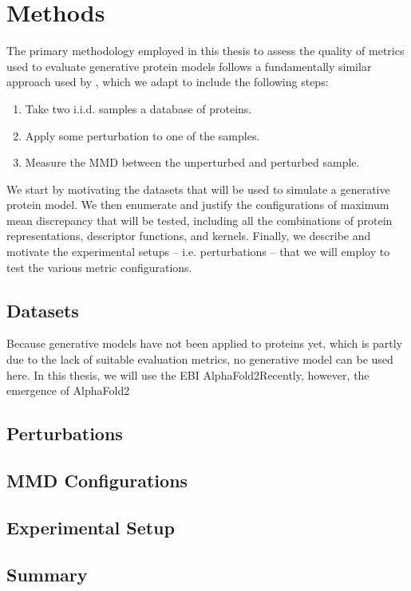 \chapter{Methods}


The primary methodology employed in this thesis to assess the quality of metrics
used to evaluate generative protein models follows a fundamentally similar
approach used by \cite{o2021evaluation}, which we adapt to include the following
steps:

\begin{enumerate}
\item Take two i.i.d. samples a database of proteins.
\item Apply some perturbation to one of the samples.
\item Measure the MMD between the unperturbed and perturbed sample.
\end{enumerate}

We start by motivating the datasets that will be used to simulate a
generative protein model. We then enumerate and justify the configurations of maximum mean
discrepancy that will be tested, including all the combinations of protein
representations, descriptor functions, and kernels. Finally, we describe and
motivate the experimental setups -- i.e. perturbations -- that we will employ to
test the various metric configurations.


\section{Datasets}

Because generative models have not been applied to proteins yet, which is partly due to
the lack of suitable evaluation metrics, no generative model can be used here.
In this thesis, we will use the EBI AlphaFold2Recently, however, the emergence of AlphaFold2

\section{Perturbations}

\section{MMD Configurations}

\section{Experimental Setup}

\section{Summary}

